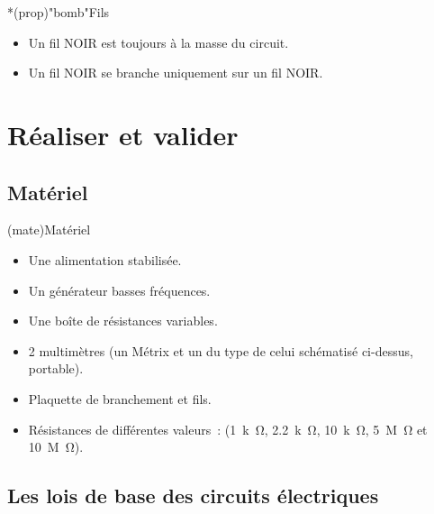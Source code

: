 \documentclass[../main/main.tex]{subfiles}
\begin{document}
\begin{tcb}*(prop)"bomb"{Fils}
	\begin{itemize}
		\item Un fil NOIR est toujours à la masse du circuit.
		\item Un fil NOIR se branche uniquement sur un fil NOIR.
	\end{itemize}
\end{tcb}

\section{Réaliser et valider}
\subsection{Matériel}
\begin{tcb}[sidebyside, sidebyside align=top](mate){Matériel}
	\begin{itemize}
		\item Une alimentation stabilisée.
		\item Un générateur basses fréquences.
		\item Une boîte de résistances variables.
		\item 2 multimètres (un Métrix et un du type de celui schématisé
		      ci-dessus, portable).
		\item Plaquette de branchement et fils.
	\end{itemize}
	\tcblower
	\begin{itemize}
		\item Résistances de différentes valeurs~: (\SI{1}{k\ohm},
		      \SI{2.2}{k\ohm}, \SI{10}{k\ohm}, \SI{5}{M\ohm} et \SI{10}{M\ohm}).
	\end{itemize}
\end{tcb}

\subsection{Les lois de base des circuits électriques}
\end{document}
